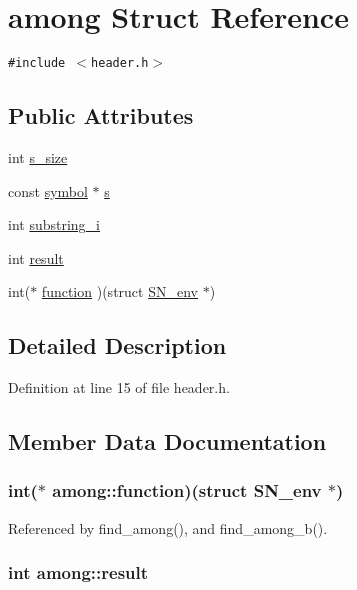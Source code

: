 \hypertarget{structamong}{
\section{among Struct Reference}
\label{structamong}
}
{\tt \#include $<$header.h$>$}

\subsection*{Public Attributes}
\begin{CompactItemize}
\item 
int \hyperlink{structamong_6306033b3dac70733b6369d8c857fa17}{s\_\-size}
\item 
const \hyperlink{api_8h_04438e24473719aaf288c57833717164}{symbol} $\ast$ \hyperlink{structamong_65bb5a8443fbadd3361d34f539fafd6e}{s}
\item 
int \hyperlink{structamong_51cda31a957593437c642a1572454131}{substring\_\-i}
\item 
int \hyperlink{structamong_228d4adee95a9a5a9055a547aeb13978}{result}
\item 
int($\ast$ \hyperlink{structamong_75cb9e53d7c2f6dd056033c01d3b989f}{function} )(struct \hyperlink{structSN__env}{SN\_\-env} $\ast$)
\end{CompactItemize}


\subsection{Detailed Description}


Definition at line 15 of file header.h.

\subsection{Member Data Documentation}
\hypertarget{structamong_75cb9e53d7c2f6dd056033c01d3b989f}{
\subsubsection[{function}]{\setlength{\rightskip}{0pt plus 5cm}int($\ast$  {\bf among::function})(struct {\bf SN\_\-env} $\ast$)}}
\label{structamong_75cb9e53d7c2f6dd056033c01d3b989f}




Referenced by find\_\-among(), and find\_\-among\_\-b().\hypertarget{structamong_228d4adee95a9a5a9055a547aeb13978}{
\subsubsection[{result}]{\setlength{\rightskip}{0pt plus 5cm}int {\bf among::result}}}
\label{structamong_228d4adee95a9a5a9055a547aeb13978}




